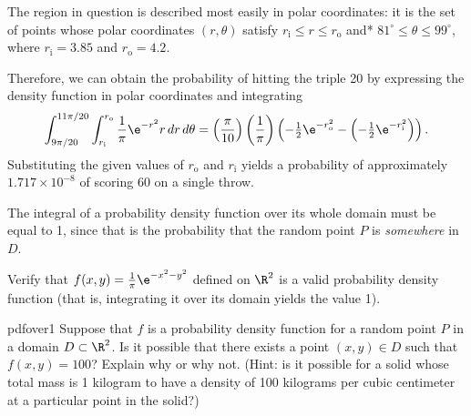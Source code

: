 \documentclass[indent]{watsonbook}
\begin{document}
\newcommand{\ri}{r_{\mathrm{i}}} \newcommand{\ro}{r_{\mathrm{o}}}
\begin{solution}
  The region in question is described most easily in polar
  coordinates: it is the set of points whose polar coordinates
  $(r,\theta)$ satisfy $\ri \leq r \leq \ro$ and*
  $81^\circ \leq \theta \leq 99^\circ$, where $\ri = 3.85$ and
  $\ro = 4.2$. 

  Therefore, we can obtain the probability of hitting the triple 20 by
  expressing the density function in polar coordinates and integrating
  \[
    \int_{9\pi/20}^{11\pi/20} \int_{\ri}^{\ro}
    \frac{1}{{\pi}}\e^{-r^2} r \, {d} r \, {d}\theta =
    \left(\frac{\pi}{10}\right) \left(\frac{1}{{\pi}}\right)
    \left(-\tfrac{1}{2}\e^{-\ro^2}-\left(-\tfrac{1}{2}\e^{-\ri^2}\right)\right).
  \]
  Substituting the given values of $\ro$ and $\ri$ yields a
  probability of approximately $\boxed{1.717\times10^{-8}}$ of scoring
  60 on a single throw.
\end{solution}

The integral of a probability density function over its whole domain
must be equal to 1, since that is the probability that the random
point $P$ is \textit{somewhere} in $D$.

\begin{exercise}{}{}
  Verify that $f(x,y) = \frac{1}{\pi} \e^{-x^2 - y^2}$ defined on
  $\R^2$ is a valid probability density function (that is, integrating
  it over its domain yields the value 1).
\end{exercise}

\begin{exercise}{}{pdfover1}
  Suppose that $f$ is a probability density function for a random
  point $P$ in a domain $D\subset \R^2$. Is it possible that there
  exists a point $(x,y) \in D$ such that $f(x,y) = 100$? Explain why
  or why not. (Hint: is it possible for a solid whose total mass is 1
  kilogram to have a density of 100 kilograms per cubic centimeter at
  a particular point in the solid?)
\end{exercise}
\end{document}
